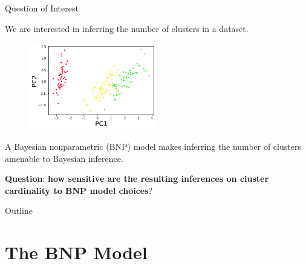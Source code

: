\documentclass[10pt]{beamer}\usepackage[]{graphicx}\usepackage[]{color}
\begin{document}
\begin{frame}{Question of Interest}

We are interested in inferring the number of clusters in a dataset.

\pause
\begin{figure}[!h]
\centering
\includegraphics[width = 0.5\textwidth]{./images/iris_data.png}
\setlength{\textfloatsep}{-10pt}
\end{figure}
\pause

A Bayesian nonparametric (BNP) model makes inferring the number of clusters amenable to
Bayesian inference.

\pause

\textbf{Question}: \textbf{how sensitive are the resulting
inferences on cluster cardinality to BNP model choices}?

\end{frame}

\begin{frame}{Outline}
   \tableofcontents
\end{frame}

\section{The BNP Model}
\end{document}
